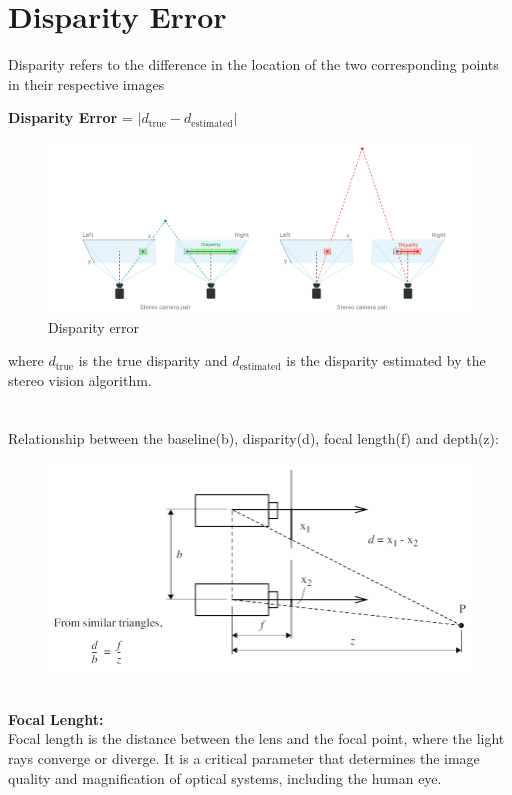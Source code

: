 \documentclass[22pt]{report}
\begin{document}
    \section{Disparity Error}
        Disparity refers to the difference in the location of the two corresponding points in their respective images \\
        \begin{center}
            \textbf{Disparity Error} = \(\left|d_{\text{true}} - d_{\text{estimated}} \right|\) \\
        \end{center}
        \begin{figure}[h]
            \centering
            \includegraphics[width=0.5\linewidth]{Images/DisparityExplanation.png}
            \caption{Disparity error}
            \label{fig:enter-label}
        \end{figure}
        where \(d_{\text{true}}\) is the true disparity and \(d_{\text{estimated}}\) is the disparity estimated by the stereo vision algorithm.\\\\\\
        Relationship between the baseline(b), disparity(d), focal length(f) and depth(z):
        \begin{figure}[h]
            \centering
            \includegraphics[width=0.5\linewidth]{Images/RelationBetweenbdfz.png}
            \caption{}
            \label{fig:enter-label}
        \end{figure}\\
        \textbf{Focal Lenght:}\\
        Focal length is the distance between the lens and the focal point, where the light rays converge or diverge. It is a critical parameter that determines the image quality and magnification of optical systems, including the human eye.
\end{document}
